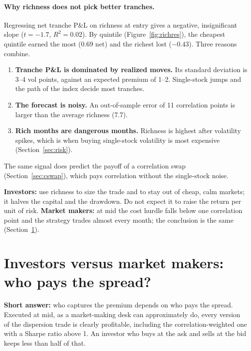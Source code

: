 \paragraph{Why richness does not pick better tranches.} Regressing net tranche P\&L on richness at entry gives a negative, insignificant slope ($t = -1.7$, $R^2 = 0.02$). By quintile (Figure~\ref{fig:richres}), the cheapest quintile earned the most (0.69 net) and the richest lost ($-0.43$). Three reasons combine.
\begin{enumerate}
  \item \textbf{Tranche P\&L is dominated by realized moves.} Its standard deviation is 3--4 vol points, against an expected premium of 1--2. Single-stock jumps and the path of the index decide most tranches.
  \item \textbf{The forecast is noisy.} An out-of-sample error of 11 correlation points is larger than the average richness (7.7).
  \item \textbf{Rich months are dangerous months.} Richness is highest after volatility spikes, which is when buying single-stock volatility is most expensive (Section~\ref{sec:risk}).
\end{enumerate}
The same signal does predict the payoff of a correlation swap (Section~\ref{sec:cswap}), which pays correlation without the single-stock noise.

\begin{desk}
\textbf{Investors:} use richness to size the trade and to stay out of cheap, calm markets; it halves the capital and the drawdown. Do not expect it to raise the return per unit of risk. \textbf{Market makers:} at mid the cost hurdle falls below one correlation point and the strategy trades almost every month; the conclusion is the same (Section~\ref{sec:spread}).
\end{desk}

\section{Investors versus market makers: who pays the spread?}\label{sec:spread}

\textbf{Short answer:} who captures the premium depends on who pays the spread. Executed at mid, as a market-making desk can approximately do, every version of the dispersion trade is clearly profitable, including the correlation-weighted one with a Sharpe ratio above 1. An investor who buys at the ask and sells at the bid keeps less than half of that.

